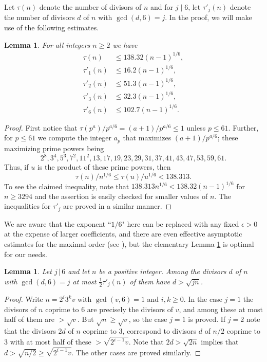 \documentclass[12pt]{amsart}
\newtheorem{lemma}[theorem]{Lemma}
\theoremstyle{definition}
\theoremstyle{remark}
\numberwithin{equation}{section}
\begin{document}
Let $\tau(n)$ denote the number of divisors of $n$ and for $j\mid 6$,  let $\tau'_j(n)$ denote
the number of  divisors $d$ of $n$ with $\gcd(d,6)=j$.
In the proof, we will make use of the following estimates.
\begin{lemma}\label{lem1}
For all integers $n\ge2$ we have
\begin{align*}
\tau(n) &\le 138.32(n-1)^{1/6},\\
\tau'_1(n)& \le 16.2(n-1)^{1/6},\\
\tau'_2(n)&\le 51.3(n-1)^{1/6},\\
\tau'_3(n)&\le 32.3(n-1)^{1/6},\\
\tau'_6(n)&\le102.7(n-1)^{1/6}.
\end{align*}
\end{lemma}
\begin{proof}
First notice that $\tau(p^a)/p^{a/6}=(a+1)/p^{a/6}\le 1$ unless $p\le61$.  Further,
for  $p\le 61$ we compute the integer $a_p$ that maximizes $(a+1)/p^{a/6}$; these
maximizing prime powers being 
\[
2^8,3^4,5^3,7^2,11^2,13,17,19,23,29,31,37,41,43,47,53,59,61.
\]
Thus, if $u$ is the product of these prime powers, then 
\[
\tau(n)/n^{1/6}\le\tau(u)/u^{1/6}<138.313.
\]
To see the claimed inequality, note that $138.313n^{1/6}<138.32(n-1)^{1/6}$ for $n\ge3294$
and the assertion is easily checked for smaller values of $n$.  The inequalities for $\tau'_j$
are proved in a similar manner.
\end{proof}

We are aware that the exponent ``$1/6$" here can be replaced with any fixed $\epsilon>0$
at the expense of larger coefficients,
and there are even effective asymptotic estimates for the maximal order
(see \cite{NR}), but the elementary
Lemma \ref{lem1} is optimal for our needs.

\begin{lemma}
\label{divisors}
Let $j\,|\, 6$ and let $n$ be a positive integer.  
Among the divisors $d$ of $n$ with $\gcd(d,6)=j$ at most $\frac12\tau'_j(n)$
of them have $d>\sqrt{jn}$.
\end{lemma}
\begin{proof}
Write $n=2^i3^kv$ with $\gcd(v,6)=1$ and $i,k\ge0$.
In the case $j=1$ the divisors of $n$ coprime to 6
are precisely the divisors of $v$, and among these at most half of them are $>\sqrt{v}$.
But $\sqrt{n}\ge\sqrt{v}$, so the case $j=1$ is proved.  If $j=2$ note that the divisors $2d$ of $n$
coprime to 3, correspond to divisors $d$ of $n/2$ coprime to 3 with at most half of these
$>\sqrt{2^{i-1}v}$.  Note that $2d>\sqrt{2n}$ implies that $d>\sqrt{n/2}\ge\sqrt{2^{i-1}v}$.
The other cases are proved similarly.
\end{proof}
\end{document}
